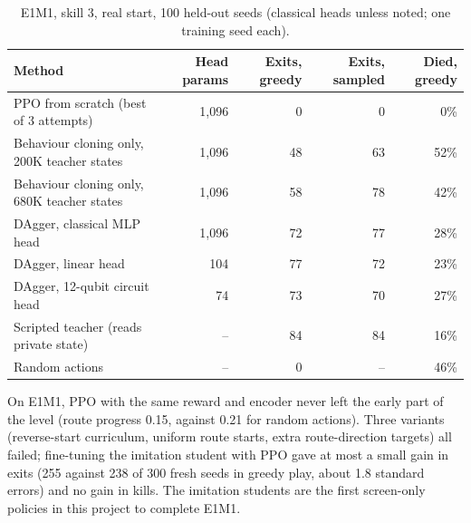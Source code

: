 \documentclass[10pt, a4paper]{article}
\begin{document}
\begin{table}[htbp]
\centering
\footnotesize
\renewcommand{\arraystretch}{1.1}
\caption{E1M1, skill 3, real start, 100 held-out seeds (classical heads unless noted; one training seed each).}
\label{tab:e1m1}
\begin{tabularx}{\textwidth}{Xrrrr}
\toprule
\textbf{Method} & \textbf{Head params} & \textbf{Exits, greedy} & \textbf{Exits, sampled} & \textbf{Died, greedy} \\
\midrule
PPO from scratch (best of 3 attempts) & 1,096 & 0 & 0 & 0\% \\
Behaviour cloning only, 200K teacher states & 1,096 & 48 & 63 & 52\% \\
Behaviour cloning only, 680K teacher states & 1,096 & 58 & 78 & 42\% \\
DAgger, classical MLP head & 1,096 & 72 & 77 & 28\% \\
DAgger, linear head & 104 & 77 & 72 & 23\% \\
DAgger, 12-qubit circuit head & 74 & 73 & 70 & 27\% \\
Scripted teacher (reads private state) & -- & 84 & 84 & 16\% \\
Random actions & -- & 0 & -- & 46\% \\
\bottomrule
\end{tabularx}
\end{table}

On E1M1, PPO with the same reward and encoder never left the early part of the level (route progress 0.15, against 0.21 for random actions). Three variants (reverse-start curriculum, uniform route starts, extra route-direction targets) all failed; fine-tuning the imitation student with PPO gave at most a small gain in exits (255 against 238 of 300 fresh seeds in greedy play, about 1.8 standard errors) and no gain in kills. The imitation students are the first screen-only policies in this project to complete E1M1.
\end{document}
